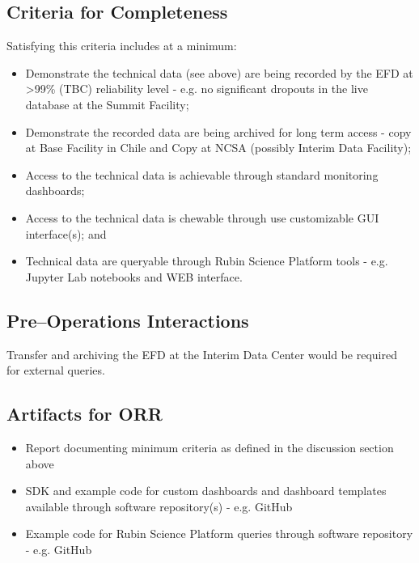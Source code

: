 \subsection{Criteria for Completeness}

Satisfying this criteria includes at a minimum:

\begin{itemize}

	\item Demonstrate the technical data (see above) are being recorded by the EFD at >99\% (TBC) reliability level - e.g. no significant dropouts in the live database at the Summit Facility;
	\item Demonstrate the recorded data are being archived for long term access - copy at Base Facility in Chile and Copy at NCSA (possibly Interim Data Facility);
	\item Access to the technical data is achievable through standard monitoring dashboards;
	\item Access to the technical data is chewable through use customizable GUI interface(s); and
	\item Technical data are queryable through Rubin Science Platform tools - e.g. Jupyter Lab notebooks and WEB interface.
	
\end{itemize}

\subsection{Pre--Operations Interactions}

Transfer and archiving the EFD at the Interim Data Center would be required for external queries.

\subsection{Artifacts for ORR}

\begin{itemize}

	\item Report documenting minimum criteria as defined in the discussion section above
	\item SDK and example code for custom dashboards and dashboard templates available through software repository(s) - e.g. GitHub
	\item Example code for Rubin Science Platform queries through software repository - e.g. GitHub
	
\end{itemize}